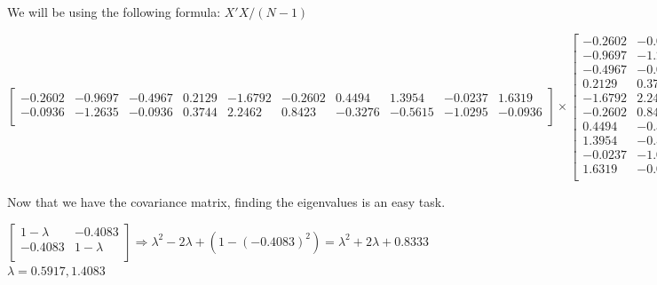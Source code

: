 \documentclass[12pt]{article}
\begin{document}
We will be using the following formula: $X'X/(N-1)$

\begin{center}
    $
    \begin{bmatrix}
        -0.2602 & -0.9697 & -0.4967 & 0.2129 & -1.6792 & -0.2602 & 0.4494 & 1.3954 & -0.0237 & 1.6319\\
        
        -0.0936 & -1.2635 & -0.0936 & 0.3744 & 2.2462 & 0.8423 & -0.3276 & -0.5615 & -1.0295 & -0.0936\\
    \end{bmatrix}
    \times
    \begin{bmatrix}
        -0.2602 & -0.0936\\
        -0.9697 & -1.2635\\
        -0.4967 & -0.0936\\
        0.2129 & 0.3744\\
        -1.6792 & 2.2462\\
        -0.2602 & 0.8423\\
        0.4494 & -0.3276\\
        1.3954 & -0.5615\\
        -0.0237 & -1.0295\\
        1.6319 & -0.0936\\
    \end{bmatrix}
    \times
    \frac{1}{9}
    =
    \begin{bmatrix}
        1.0000 & -0.4083 \\
        -0.4083 & 1.0000 \\
    \end{bmatrix}
    $
    
\end{center}

\noindent
Now that we have the covariance matrix, finding the eigenvalues is an easy task.

\begin{center}
    $
    \begin{bmatrix}
        1 - \lambda & -0.4083\\
        -0.4083 & 1 - \lambda \\
    \end{bmatrix}
    \Rightarrow
    \lambda^2 - 2\lambda+(1-(-0.4083)^2)=\lambda^2+2\lambda+0.8333
    $
    \\
    $
    \lambda=0.5917, 1.4083
    $
\end{center}
\end{document}

